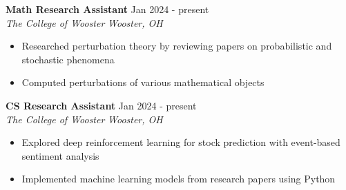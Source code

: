 \documentclass[a4paper,12pt]{article}
\begin{document}
\textbf{Math Research Assistant} \hfill \textnormal{Jan 2024 - present}\\
\textit{The College of Wooster} \hfill \textit{Wooster, OH}
\begin{itemize}
    \item Researched perturbation theory by reviewing papers on probabilistic and stochastic phenomena
    \item Computed perturbations of various mathematical objects
\end{itemize}

\textbf{CS Research Assistant} \hfill \textnormal{Jan 2024 - present}\\
\textit{The College of Wooster} \hfill \textit{Wooster, OH}
\begin{itemize}
    \item Explored deep reinforcement learning for stock prediction with event-based sentiment analysis
    \item Implemented machine learning models from research papers using Python
\end{itemize}
\end{document}
